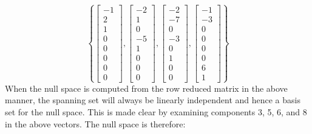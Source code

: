 \documentclass{article}
\begin{document}
\begin{itemize}
\[\left\{\begin{bmatrix} -1 \\ 2 \\ 1 \\ 0 \\ 0 \\ 0 \\ 0 \\ 0 \end{bmatrix}, \begin{bmatrix} -2 \\ 1 \\ 0 \\ -5 \\ 1 \\ 0 \\ 0 \\ 0 \end{bmatrix}, \begin{bmatrix} -2 \\ -7 \\ 0 \\ -3 \\ 0 \\ 1 \\ 0 \\ 0 \end{bmatrix}, \begin{bmatrix} -1 \\ -3 \\ 0 \\ 0 \\ 0 \\ 0 \\ 6 \\ 1 \end{bmatrix}\right\}\]
When the null space is computed from the row reduced matrix in the above manner, the spanning set will always be linearly independent and hence a basis set for the null space. This is made clear by examining components 3, 5, 6, and 8 in the above vectors. The null space is therefore:

\end{itemize}
\end{document}
